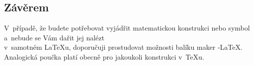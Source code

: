 \documentclass[a4paper, 11pt, times]{article}
\theoremstyle{definition}
\theoremstyle{theorem}
\theoremstyle{remark}
\begin{document}
\begin{twocolumn}
\section{Závěrem}
V~případě, že budete potřebovat vyjádřit matematickou konstrukci
nebo symbol a~nebude se Vám dařit jej nalézt \\ v~samotném \LaTeX u,
doporučuji prostudovat možnosti balíku maker \AmS-\LaTeX.
Analogická poučka platí obecně pro jakoukoli konstrukci v~\TeX u.

\end{twocolumn}
\end{document}
